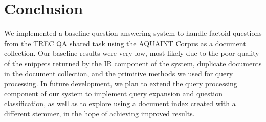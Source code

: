 \documentclass[11pt]{article}
\begin{document}
\section{Conclusion}

We implemented a baseline question answering system to handle factoid questions from the TREC QA shared task using the AQUAINT Corpus as a document collection. Our baseline results were very low, most likely due to the poor quality of the snippets returned by the IR component of the system, duplicate documents in the document collection, and the primitive methods we used for query processing. In future development, we plan to extend the query processing component of our system to implement query expansion and question classification, as well as to explore using a document index created with a different stemmer, in the hope of achieving improved results.

\nocite{*}




\end{document}
